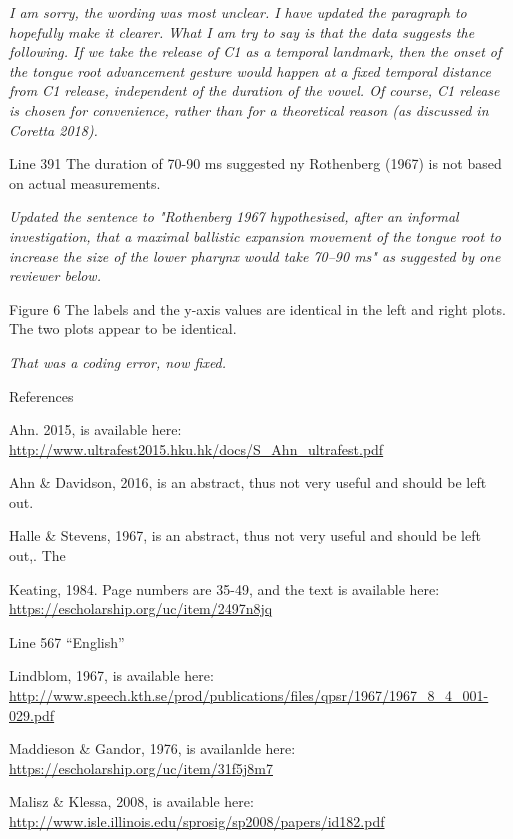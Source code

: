 \documentclass[]{article}
\begin{document}
\begin{adjustwidth}{1cm}{} \textit{
I am sorry, the wording was most unclear. I have updated the paragraph to hopefully make it clearer. What I am try to say is that the data suggests the following. If we take the release of C1 as a temporal landmark, then the onset of the tongue root advancement gesture would happen at a fixed temporal distance from C1 release, independent of the duration of the vowel. Of course, C1 release is chosen for convenience, rather than for a theoretical reason (as discussed in Coretta 2018).
} \end{adjustwidth}

Line 391 The duration of 70-90 ms suggested ny Rothenberg (1967) is not
based on actual measurements.

\begin{adjustwidth}{1cm}{} \textit{
Updated the sentence to "Rothenberg 1967 hypothesised, after an informal investigation, that a maximal ballistic expansion movement of the tongue root to increase the size of the lower pharynx would take 70--90 ms" as suggested by one reviewer below.
} \end{adjustwidth}

Figure 6 The labels and the y-axis values are identical in the left and
right plots. The two plots appear to be identical.

\begin{adjustwidth}{1cm}{} \textit{
That was a coding error, now fixed.
} \end{adjustwidth}

References

Ahn. 2015, is available here:
\url{http://www.ultrafest2015.hku.hk/docs/S_Ahn_ultrafest.pdf}

Ahn \& Davidson, 2016, is an abstract, thus not very useful and should
be left out.

Halle \& Stevens, 1967, is an abstract, thus not very useful and should
be left out,. The

Keating, 1984. Page numbers are 35-49, and the text is available here:
\url{https://escholarship.org/uc/item/2497n8jq}

Line 567 ``English''

Lindblom, 1967, is available here:
\url{http://www.speech.kth.se/prod/publications/files/qpsr/1967/1967_8_4_001-029.pdf}

Maddieson \& Gandor, 1976, is availanlde here:
\url{https://escholarship.org/uc/item/31f5j8m7}

Malisz \& Klessa, 2008, is available here:
\url{http://www.isle.illinois.edu/sprosig/sp2008/papers/id182.pdf}
\end{document}
